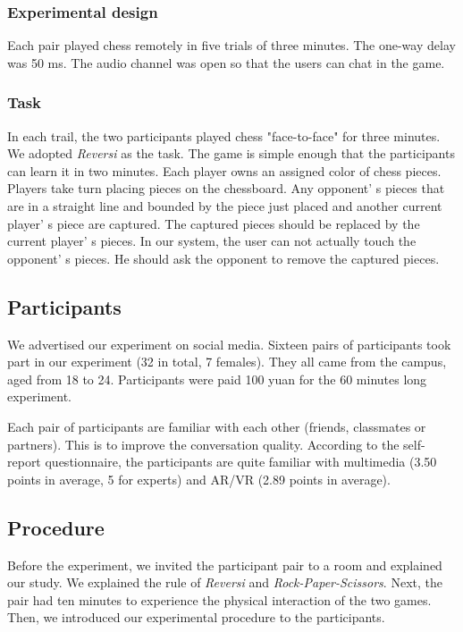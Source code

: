 \subsubsection{Experimental design}

Each pair played chess remotely in five trials of three minutes. The one-way delay was 50 ms. The audio channel was open so that the users can chat in the game.

\subsubsection{Task}

In each trail, the two participants played chess "face-to-face" for three minutes. We adopted \emph{Reversi} as the task. The game is simple enough that the participants can learn it in two minutes. Each player owns an assigned color of chess pieces. Players take turn placing pieces on the chessboard. Any opponent' s pieces that are in a straight line and bounded by the piece just placed and another current player' s piece are captured. The captured pieces should be replaced by the current player' s pieces. In our system, the user can not actually touch the opponent' s pieces. He should ask the opponent to remove the captured pieces.

\subsection{Participants}

We advertised our experiment on social media. Sixteen pairs of participants took part in our experiment (32 in total, 7 females). They all came from the campus, aged from 18 to 24. Participants were paid 100 yuan for the 60 minutes long experiment.

Each pair of participants are familiar with each other (friends, classmates or partners). This is to improve the conversation quality. According to the self-report questionnaire, the participants are quite familiar with multimedia (3.50 points in average, 5 for experts) and AR/VR (2.89 points in average).

\subsection{Procedure}

Before the experiment, we invited the participant pair to a room and explained our study. We explained the rule of \emph{Reversi} and \emph{Rock-Paper-Scissors}. Next, the pair had ten minutes to experience the physical interaction of the two games. Then, we introduced our experimental procedure to the participants.

